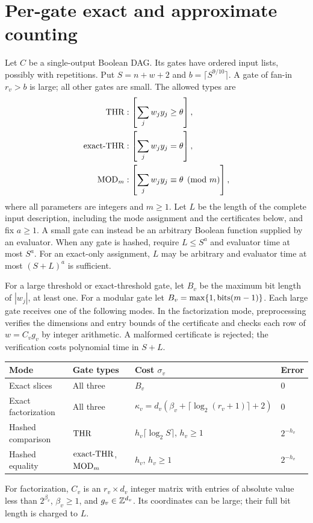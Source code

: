 \section{Per-gate exact and approximate counting}
\label{sec:unified}

Let $C$ be a single-output Boolean DAG. Its gates have ordered input
lists, possibly with repetitions. Put $S=n+w+2$ and
$b=\lceil S^{9/10}\rceil$. A gate of fan-in $r_v>b$ is large; all
other gates are small. The allowed types are
\[
\begin{aligned}
\mathrm{THR} &: \left[\sum_jw_jy_j\ge\theta\right],\\
\mathrm{exact\text{-}THR} &: \left[\sum_jw_jy_j=\theta\right],\\
\mathrm{MOD}_m &: \left[\sum_jw_jy_j\equiv\theta\pmod m\right],
\end{aligned}
\]
where all parameters are integers and $m\ge1$. Let $L$ be the length
of the complete input description, including the mode assignment and
the certificates below, and fix $a\ge1$. A small gate can instead
be an arbitrary Boolean function supplied by an evaluator. When any
gate is hashed, require $L\le S^a$ and evaluator time at most $S^a$.
For an exact-only assignment, $L$ may be arbitrary and evaluator time
at most $(S+L)^a$ is sufficient.

For a large threshold or exact-threshold gate, let $B_v$ be the maximum
bit length of $|w_j|$, at least one. For a modular gate let
$B_v=\max\{1,\operatorname{bits}(m-1)\}$. Each large gate receives one of the
following modes. In the factorization mode, preprocessing verifies the
dimensions and entry bounds of the certificate and checks each row of
$w=C_vg_v$ by integer arithmetic. A malformed certificate is rejected;
the verification costs polynomial time in $S+L$.
\begin{center}\small
\renewcommand{\arraystretch}{1.15}
\begin{tabular}{@{}P{.16\linewidth}P{.22\linewidth}P{.37\linewidth}P{.15\linewidth}@{}}
\toprule
Mode & Gate types & Cost $\sigma_v$ & Error\\
\midrule
Exact slices & All three & $B_v$ & $0$\\
Exact factorization & All three & $\kappa_v=d_v(\beta_v+\lceil\log_2(r_v+1)\rceil+2)$ & $0$\\
Hashed comparison & $\mathrm{THR}$ & $h_v\lceil\log_2S\rceil$, $h_v\ge1$ & $2^{-h_v}$\\
Hashed equality & $\mathrm{exact\text{-}THR}$, $\mathrm{MOD}_m$ & $h_v$, $h_v\ge1$ & $2^{-h_v}$\\
\bottomrule
\end{tabular}
\end{center}
For factorization, $C_v$ is an $r_v\times d_v$ integer matrix with
entries of absolute value less than $2^{\beta_v}$, $\beta_v\ge1$,
and $g_v\in\mathbb Z^{d_v}$. Its coordinates can be large; their full bit
length is charged to $L$.

